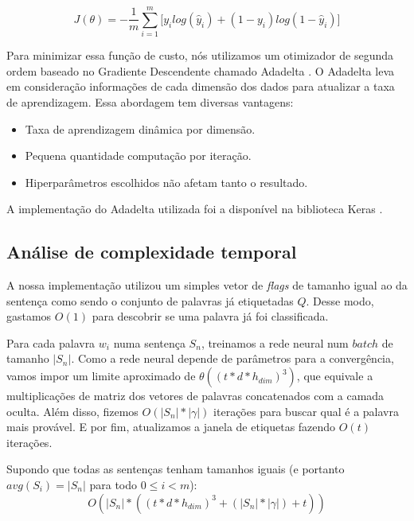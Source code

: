 \begin{equation} \label{eq:categorial_crossentropy}
J(\theta) = - \frac{1}{m} \sum\limits_{i=1}^{m} \Big[ y_ilog(\hat{y}_i) + (1 - y_i)log(1 - \hat{y}_i) \Big]
\end{equation}

Para minimizar essa função de custo, nós utilizamos um otimizador de segunda ordem baseado no Gradiente Descendente chamado Adadelta \cite{Bengio-et-al-2015-Book}. O Adadelta leva em consideração informações de cada dimensão dos dados para atualizar a taxa de aprendizagem. Essa abordagem tem diversas vantagens:

\begin{itemize}
\item Taxa de aprendizagem dinâmica por dimensão.
\item Pequena quantidade computação por iteração.
\item Hiperparâmetros escolhidos não afetam tanto o resultado. 
\end{itemize}

A implementação do Adadelta utilizada foi a disponível na biblioteca Keras \cite{kerasframework}.



\subsection{Análise de complexidade temporal}\label{subsec:analisecomplexidade1}

A nossa implementação utilizou um simples vetor de \textit{flags} de tamanho igual ao da sentença como sendo o conjunto de palavras já etiquetadas $Q$. Desse modo, gastamos $O(1)$ para descobrir se uma palavra já foi classificada. 

Para cada palavra $w_i$ numa sentença $S_n$, treinamos a rede neural num $batch$ de tamanho $|S_n|$. Como a rede neural depende de parâmetros para a convergência, vamos impor um limite aproximado de $\theta((t*d*h_{dim})^3)$, que equivale a multiplicações de matriz dos vetores de palavras concatenados com a camada oculta. Além disso, fizemos $O(|S_n| * |\gamma|)$ iterações para buscar qual é a palavra mais provável. E por fim, atualizamos a janela de etiquetas fazendo $O(t)$ iterações.

Supondo que todas as sentenças tenham tamanhos iguais (e portanto $avg(S_i) = |S_n|$ para todo $0 \leq i < m $):
\begin{equation} \nonumber
O(|S_n| * ((t*d*h_{dim})^3 + (|S_n| * |\gamma|) + t))
\end{equation}

